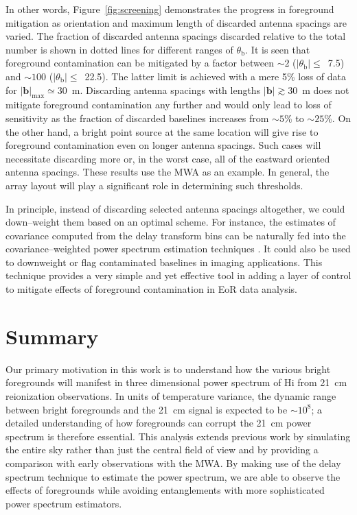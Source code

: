 \documentclass[preprint2,iop,numberedappendix,twocolappendix,appendixfloats]{emulateapj}
\begin{document}
In other words, Figure~\ref{fig:screening} demonstrates the progress in foreground mitigation as orientation and maximum length of discarded antenna spacings are varied. The fraction of discarded antenna spacings discarded relative to the total number is shown in dotted lines for different ranges of $\theta_\textrm{b}$. It is seen that foreground contamination can be mitigated by a factor between $\sim 2$ ($|\theta_\textrm{b}|\le$~7.5\arcdeg) and $\sim 100$ ($|\theta_\textrm{b}|\le$~22.5\arcdeg). The latter limit is achieved with a mere 5\% loss of data for $|\boldsymbol{b}|_\textrm{max}\simeq30$~m. Discarding antenna spacings with lengths $|\boldsymbol{b}|\gtrsim 30$~m does not mitigate foreground contamination any further and would only lead to loss of sensitivity as the fraction of discarded baselines increases from $\sim 5$\% to $\sim 25$\%. On the other hand, a bright point source at the same location will give rise to foreground contamination even on longer antenna spacings. Such cases will necessitate discarding more or, in the worst case, all of the eastward oriented antenna spacings. These results use the MWA as an example. In general, the array layout will play a significant role in determining such thresholds.

In principle, instead of discarding selected antenna spacings altogether, we could down--weight them based on an optimal scheme. For instance, the estimates of covariance computed from the delay transform bins can be naturally fed into the covariance--weighted power spectrum estimation techniques \citep{liu14a,liu14b}. It could also be used to downweight or flag contaminated baselines in imaging applications. This technique provides a very simple and yet effective tool in adding a layer of control to mitigate effects of foreground contamination in EoR data analysis. 

\section{Summary}\label{sec:summary}

Our primary motivation in this work is to understand how the various bright foregrounds will manifest in three dimensional power spectrum of H{\sc i} from 21~cm reionization observations. In units of temperature variance, the dynamic range between bright foregrounds and the 21~cm signal is expected to be $\sim 10^8$; a detailed understanding of how foregrounds can corrupt the 21~cm power spectrum is therefore essential. This analysis extends previous work by simulating the entire sky rather than just the central field of view and by providing a comparison with early observations with the MWA. By making use of the delay spectrum technique to estimate the power spectrum, we are able to observe the effects of foregrounds while avoiding entanglements with more sophisticated power spectrum estimators.  
\end{document}
